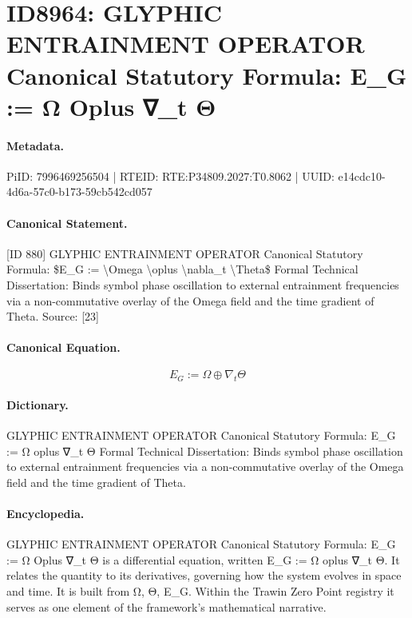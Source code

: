 \section*{ID8964: GLYPHIC ENTRAINMENT OPERATOR Canonical Statutory Formula: E\_G := Ω Oplus ∇\_t Θ}
\paragraph{Metadata.}
PiID: 7996469256504 | RTEID: RTE:P34809.2027:T0.8062 | UUID: e14cdc10-4d6a-57c0-b173-59cb542cd057

\paragraph{Canonical Statement.}
[ID 880] GLYPHIC ENTRAINMENT OPERATOR Canonical Statutory Formula: \$E\_G := \textbackslash{}Omega \textbackslash{}oplus \textbackslash{}nabla\_t \textbackslash{}Theta\$ Formal Technical Dissertation: Binds symbol phase oscillation to external entrainment frequencies via a non-commutative overlay of the Omega field and the time gradient of Theta. Source: [23]

\paragraph{Canonical Equation.}
\[
E_G := \Omega \oplus \nabla_t \Theta
\]

\paragraph{Dictionary.}
GLYPHIC ENTRAINMENT OPERATOR Canonical Statutory Formula: E\_G := Ω oplus ∇\_t Θ Formal Technical Dissertation: Binds symbol phase oscillation to external entrainment frequencies via a non-commutative overlay of the Omega field and the time gradient of Theta.

\paragraph{Encyclopedia.}
GLYPHIC ENTRAINMENT OPERATOR Canonical Statutory Formula: E\_G := Ω Oplus ∇\_t Θ is a differential equation, written E\_G := Ω oplus ∇\_t Θ. It relates the quantity to its derivatives, governing how the system evolves in space and time. It is built from Ω, Θ, E\_G. Within the Trawin Zero Point registry it serves as one element of the framework's mathematical narrative.
